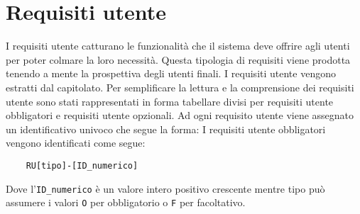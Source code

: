 \section{Requisiti utente}
\label{sec:requisiti_utente}
I requisiti utente catturano le funzionalità che il sistema deve offrire agli utenti per poter colmare la loro necessità.
Questa tipologia di requisiti viene prodotta tenendo a mente la prospettiva degli utenti finali.
I requisiti utente vengono estratti dal capitolato.
Per semplificare la lettura e la comprensione dei requisiti utente sono stati rappresentati in forma tabellare divisi per requisiti utente obbligatori e requisiti utente opzionali.
Ad ogni requisito utente viene assegnato un identificativo univoco che segue la forma:
I requisiti utente obbligatori vengono identificati come segue:
\begin{lstlisting}
    RU[tipo]-[ID_numerico]
\end{lstlisting}
Dove l'\lstinline{ID_numerico} è un valore intero positivo crescente mentre tipo può assumere i valori \lstinline{O} per obbligatorio o \lstinline{F} per facoltativo.



